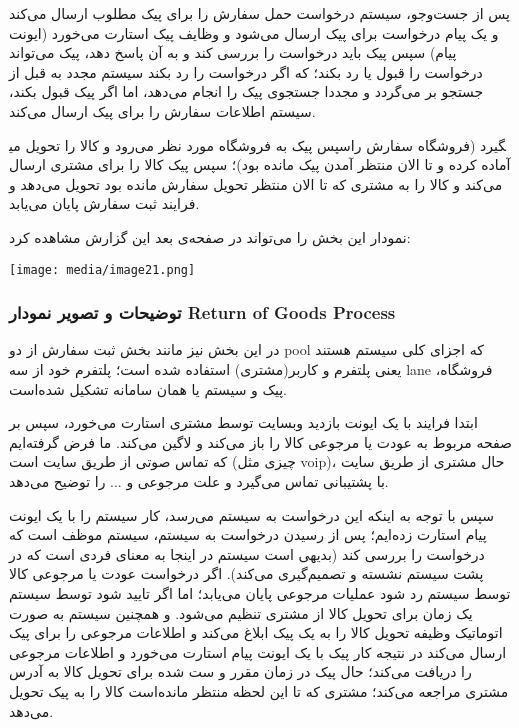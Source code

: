 \documentclass[]{article}
\begin{document}
پس از جست‌وجو، سیستم درخواست حمل سفارش را برای پیک مطلوب ارسال می‌کند و
یک پیام درخواست برای پیک ارسال می‌شود و وظایف پیک استارت می‌خورد (ایونت
پیام) سپس پیک باید درخواست را بررسی کند و به آن پاسخ دهد، پیک می‌تواند
درخواست را قبول یا رد بکند؛ که اگر درخواست را رد بکند سیستم مجدد به قبل
از جستجو بر می‌گردد و مجددا جستجوی پیک را انجام می‌دهد، اما اگر پیک قبول
بکند، سیستم اطلاعات سفارش را برای پیک ارسال می‌کند.

سپس پیک به فروشگاه مورد نظر می‌رود و کالا را تحویل می‎گیرد (فروشگاه
سفارش را آماده کرده و تا الان منتظر آمدن پیک مانده بود)؛ سپس پیک کالا را
برای مشتری ارسال می‌کند و کالا را به مشتری که تا الان منتظر تحویل سفارش
مانده بود تحویل می‌دهد و فرایند ثبت سفارش پایان می‌یابد.

نمودار این بخش را می‌تواند در صفحه‌ی بعد این گزارش مشاهده کرد:

\texttt{[image: media/image21.png]}

\subsubsection{توضیحات و تصویر نمودار Return of Goods
Process}\label{ux62aux648ux636ux6ccux62dux627ux62a-ux648-ux62aux635ux648ux6ccux631-ux646ux645ux648ux62fux627ux631-return-of-goods-process}

در این بخش نیز مانند بخش ثبت سفارش از دو pool که اجزای کلی سیستم هستند
یعنی پلتفرم و کاربر(مشتری) استفاده شده است؛ پلتفرم خود از سه lane
فروشگاه، پیک و سیستم یا همان سامانه تشکیل شده‌است.

ابتدا فرایند با یک ایونت بازدید وبسایت توسط مشتری استارت می‌خورد، سپس بر
صفحه مربوط به عودت یا مرجوعی کالا را باز می‌کند و لاگین می‌کند. ما فرض
گرفته‌ایم که تماس صوتی از طریق سایت است (چیزی مثل voip)، حال مشتری از
طریق سایت با پشتیبانی تماس می‌گیرد و علت مرجوعی و ... را توضیح می‌دهد.

سپس با توجه به اینکه این درخواست به سیستم می‌رسد، کار سیستم را با یک
ایونت پیام استارت زده‌ایم؛ پس از رسیدن درخواست به سیستم، سیستم موظف است
که درخواست را بررسی کند (بدیهی است سیستم در اینجا به معنای فردی است که
در پشت سیستم نشسته و تصمیم‌گیری می‌کند). اگر درخواست عودت یا مرجوعی کالا
توسط سیستم رد شود عملیات مرجوعی پایان می‌یابد؛ اما اگر تایید شود توسط
سیستم یک زمان برای تحویل کالا از مشتری تنظیم می‌شود. و همچنین سیستم به
صورت اتوماتیک وظیفه تحویل کالا را به یک پیک ابلاغ می‌کند و اطلاعات
مرجوعی را برای پیک ارسال می‌کند در نتیجه کار پیک با یک ایونت پیام استارت
می‌خورد و اطلاعات مرجوعی را دریافت می‌کند؛ حال پیک در زمان مقرر و ست شده
برای تحویل کالا به آدرس مشتری مراجعه می‌کند؛ مشتری که تا این لحظه منتظر
مانده‌است کالا را به پیک تحویل می‌دهد.
\end{document}
